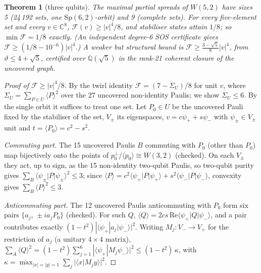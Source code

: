 \documentclass[11pt]{article}
\newtheorem{theorem}{Theorem}
\theoremstyle{remark}\newtheorem*{remark}{Remark}
\newcommand{\F}{\mathcal{F}}
\begin{document}
\begin{theorem}[three qubits]\label{t:3}
The maximal partial spreads of $W(5,2)$ have sizes 5 (24\,192 sets, one $\mathrm{Sp}(6,2)$-orbit) and 9 (complete sets). For every
five-element set and every $v\in\mathbb{C}^8$, $\F(v)\ge|v|^4/8$, and stabiliser states attain $1/8$; so $\min\F=1/8$ exactly.
(An independent degree-6 SOS certificate gives $\F\ge(1/8-10^{-6})|v|^4$.) A weaker but structural bound is $\F\ge\frac{3-\sqrt5}{8}|v|^4$, from $\vartheta\le4+\sqrt5$, certified over $\mathbb{Q}(\sqrt5)$ in the rank-21
coherent closure of the uncovered graph.
\end{theorem}
\begin{proof}[Proof of $\F\ge|v|^4/8$]
By the twirl identity $\F=(7-\Sigma_U)/8$ for unit $v$, where $\Sigma_U=\sum_{P\in U}\langle P\rangle^2$ over the 27 uncovered
non-identity Paulis; we show $\Sigma_U\le6$. By the single orbit it suffices to treat one set. Let $P_0\in U$ be the uncovered Pauli fixed by
the stabiliser of the set, $V_\pm$ its eigenspaces, $v=c\psi_++s\psi_-$ with $\psi_\pm\in V_\pm$ unit and $t=\langle P_0\rangle=c^2-s^2$.

\emph{Commuting part.} The 15 uncovered Paulis $B$ commuting with $P_0$ (other than $P_0$) map bijectively onto the points of
$p_0^\perp/\langle p_0\rangle\cong W(3,2)$ (checked). On each $V_\pm$ they act, up to sign, as the 15 non-identity two-qubit Paulis, so
two-qubit purity gives $\sum_B\langle\psi_\pm|P|\psi_\pm\rangle^2\le3$; since $\langle P\rangle=c^2\langle\psi_+|P|\psi_+\rangle+s^2\langle\psi_-|P|\psi_-\rangle$,
convexity gives $\sum_B\langle P\rangle^2\le3$.

\emph{Anticommuting part.} The 12 uncovered Paulis anticommuting with $P_0$ form six pairs $\{a_j,\,\pm ia_jP_0\}$ (checked). For such
$Q$, $\langle Q\rangle=2cs\,\mathrm{Re}\langle\psi_+|Q|\psi_-\rangle$, and a pair contributes exactly $(1-t^2)|\langle\psi_+|a_j|\psi_-\rangle|^2$.
Writing $M_j:V_-\to V_+$ for the restriction of $a_j$ (a unitary $4\times4$ matrix),
$\sum_A\langle Q\rangle^2=(1-t^2)\sum_{j=1}^6|\langle\psi_+|M_j\psi_-\rangle|^2\le(1-t^2)\,\kappa$, with
$\kappa=\max_{|x|=|y|=1}\sum_j|\langle x|M_jy\rangle|^2$.


\end{proof}
\end{document}
